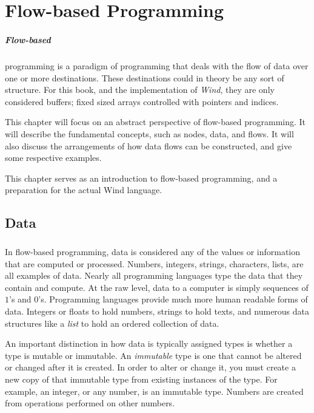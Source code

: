 
\chapter{Flow-based Programming}

\paragraph{Flow-based} programming is a paradigm of programming that deals with the flow of data over one or more destinations. These destinations could in theory be any sort of structure. For this book, and the implementation of \emph{Wind}, they are only considered buffers; fixed sized arrays controlled with pointers and indices. 
\par This chapter will focus on an abstract perspective of flow-based programming. It will describe the fundamental concepts, such as nodes, data, and flows. It will also discuss the arrangements of how data flows can be constructed, and give some respective examples.
\par This chapter serves as an introduction to flow-based programming, and a preparation for the actual Wind language. 

\section{Data}

\paragraph{  } In flow-based programming, data is considered any of the values or information that are computed or processed. Numbers, integers, strings, characters, lists, are all examples of data. Nearly all programming languages type the data that they contain and compute. At the raw level, data to a computer is simply sequences of $1$'s and $0$'s. Programming languages provide much more human readable forms of data. Integers or floats to hold numbers, strings to hold texts, and numerous data structures like a \emph{list} to hold an ordered collection of data.

\par An important distinction in how data is typically assigned types is whether a type is mutable or immutable. An \emph{immutable} type is one that cannot be altered or changed after it is created. In order to alter or change it, you must create a new copy of that immutable type from existing instances of the type. For example, an integer, or any number, is an immutable type. Numbers are created from operations performed on other numbers.

